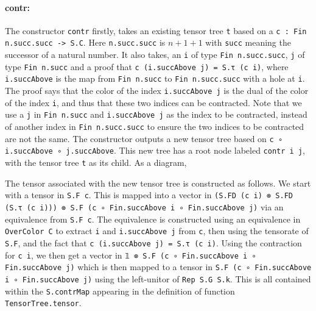 \documentclass[a4paper, 11pt]{article}
\DeclareRobustCommand{\myinline}{\lstinline}
\newcommand{\tensorTree}[1]{
\begin{center}
  \fcolorbox{mycolor}{white}{%
#1}
\end{center}
}
\begin{document}
\paragraph{contr:}
The constructor \myinline|contr| firstly, takes an existing tensor tree \myinline|t| based on a 
\myinline|c : Fin n.succ.succ -> S.C|. Here \myinline|n.succ.succ| is $n + 1 + 1$ with \myinline|succ| meaning 
the successor of a natural number. 
It also takes,
an \myinline|i| of type \myinline|Fin n.succ.succ|, \myinline|j| of type \myinline|Fin n.succ|
and a proof that \myinline|c (i.succAbove j) = S.τ (c i)|, where \myinline|i.succAbove| is the map from \myinline|Fin n.succ| to \myinline|Fin n.succ.succ| with a hole at \myinline|i|. 
The proof says that the color of the index \myinline|i.succAbove j| is the dual of the color of the index \myinline|i|, and thus that these 
two indices can be contracted.
Note that we use a \myinline|j| in \myinline|Fin n.succ| and \myinline|i.succAbove j| as the index to be contracted, instead 
of another index in  \myinline|Fin n.succ.succ| to ensure the two indices to be contracted are not the same. 
The constructor outputs a new tensor tree based on \myinline|c ∘ i.succAbove ∘ j.succAbove|. 
This new tree has a root node labeled \myinline|contr i j|, with the tensor tree \myinline|t| as its child.
As a diagram, 
\tensorTree{
  \begin{tikzpicture}
    \node[draw=black] (A) at (0,0) {\lstinline|contr i j|};
    \node (B) at (0,-1) {\lstinline|t|};
    \draw[->] (A) -- (B);
  \end{tikzpicture} 
}
The tensor associated with the new tensor tree is constructed as follows. 
We start with a tensor in \myinline|S.F c|.
This is mapped into a vector in \myinline|(S.FD (c i) ⊗ S.FD (S.τ (c i))) ⊗ S.F (c ∘ Fin.succAbove i ∘ Fin.succAbove j)| via an equivalence from 
\myinline|S.F c|. The equivalence is constructed using an equivalence 
in \myinline|OverColor C| to extract \myinline|i| and \myinline|i.succAbove j| from \myinline|c|,
then using the tensorate of \myinline|S.F|, and the fact that \myinline|c (i.succAbove j) = S.τ (c i)|. 
Using the contraction for \myinline|c i|, we then get a vector in 
\myinline|𝟙 ⊗ S.F (c ∘ Fin.succAbove i ∘ Fin.succAbove j)| which is then 
mapped to a tensor in \myinline|S.F (c ∘ Fin.succAbove i ∘ Fin.succAbove j)|
using the left-unitor of \myinline|Rep S.G S.k|.
This is all contained within the \myinline|S.contrMap| appearing in the definition of
function \myinline|TensorTree.tensor|.
\end{document}
